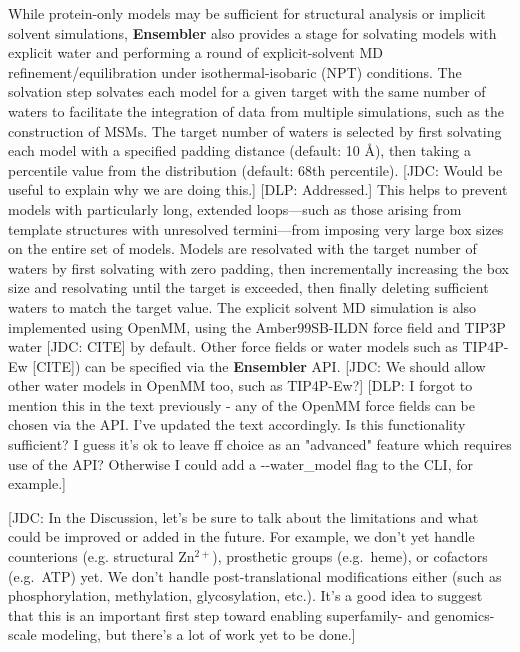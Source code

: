 \documentclass[aps,pre,twocolumn,nofootinbib,superscriptaddress,linenumbers]{revtex4-1}
\begin{document}
While protein-only models may be sufficient for structural analysis or implicit solvent simulations, {\bf Ensembler} also provides a stage for solvating models with explicit water and performing a round of explicit-solvent MD refinement/equilibration under isothermal-isobaric (NPT) conditions.
The solvation step solvates each model for a given target with the same number of waters to facilitate the integration of data from multiple simulations, such as the construction of MSMs.
The target number of waters is selected by first solvating each model with a specified padding distance (default: 10 \AA), then taking a percentile value from the distribution (default: 68th percentile).
{\color{red}[JDC: Would be useful to explain why we are doing this.]}
{\color{blue}[DLP: Addressed.]}
This helps to prevent models with particularly long, extended loops---such as those arising from template structures with unresolved termini---from imposing very large box sizes on the entire set of models.
Models are resolvated with the target number of waters by first solvating with zero padding, then incrementally increasing the box size and resolvating until the target is exceeded, then finally deleting sufficient waters to match the target value.
The explicit solvent MD simulation is also implemented using OpenMM, using the Amber99SB-ILDN force field and TIP3P water {\color{red}[JDC: CITE]} by default.
Other force fields or water models such as TIP4P-Ew {\color{red}[CITE]}) can be specified via the {\bf Ensembler} API.
{\color{red}[JDC: We should allow other water models in OpenMM too, such as TIP4P-Ew?]}
{\color{blue}[DLP: I forgot to mention this in the text previously - any of the OpenMM force fields can be chosen via the API. I've updated the text accordingly. Is this functionality sufficient? I guess it's ok to leave ff choice as an "advanced" feature which requires use of the API? Otherwise I could add a -{}-water\_model flag to the CLI, for example.]}

{\color{red}[JDC: In the Discussion, let's be sure to talk about the limitations and what could be improved or added in the future.  For example, we don't yet handle counterions (e.g. structural Zn$^{2+}$), prosthetic groups (e.g.~heme), or cofactors (e.g.~ATP) yet.  We don't handle post-translational modifications either (such as phosphorylation, methylation, glycosylation, etc.).  It's a good idea to suggest that this is an important first step toward enabling superfamily- and genomics-scale modeling, but there's a lot of work yet to be done.]}
\end{document}
